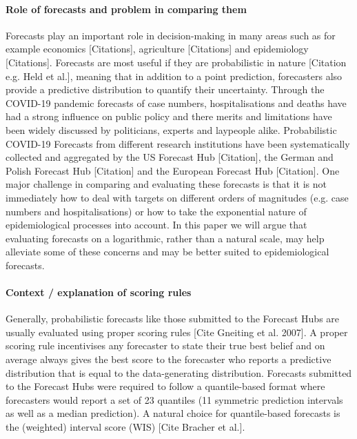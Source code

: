 \documentclass{article}
\begin{document}
\paragraph{Role of forecasts and problem in comparing them}

Forecasts play an important role in decision-making in many areas such as for example economics [Citations], agriculture [Citations] and epidemiology [Citations]. Forecasts are most useful if they are probabilistic in nature [Citation e.g. Held et al.], meaning that in addition to a point prediction, forecasters also provide a predictive distribution to quantify their uncertainty. Through the COVID-19 pandemic forecasts of case numbers, hospitalisations and deaths have had a strong influence on public policy and there merits and limitations have been widely discussed by politicians, experts and laypeople alike. Probabilistic COVID-19 Forecasts from different research institutions have been systematically collected and aggregated by the US Forecast Hub [Citation], the German and Polish Forecast Hub [Citation] and the European Forecast Hub [Citation]. One major challenge in comparing and evaluating these forecasts is that it is not immediately how to deal with targets on different orders of magnitudes (e.g. case numbers and hospitalisations) or how to take the exponential nature of epidemiological processes into account. In this paper we will argue that evaluating forecasts on a logarithmic, rather than a natural scale, may help alleviate some of these concerns and may be better suited to epidemiological forecasts. 


\paragraph{Context / explanation of scoring rules}
Generally, probabilistic forecasts like those submitted to the Forecast Hubs are usually evaluated using proper scoring rules [Cite Gneiting et al. 2007]. A proper scoring rule incentivises any forecaster to state their true best belief and on average always gives the best score to the forecaster who reports a predictive distribution that is equal to the data-generating distribution. Forecasts submitted to the Forecast Hubs were required to follow a quantile-based format where forecasters would report a set of 23 quantiles (11 symmetric prediction intervals as well as a median prediction). A natural choice for quantile-based forecasts is the (weighted) interval score (WIS) [Cite Bracher et al.]. 
\end{document}
